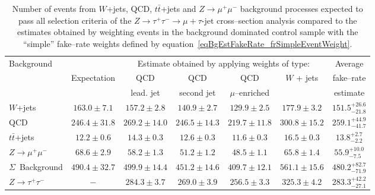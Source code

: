 \begin{table}[t]
\begin{center}
\tablesize
\begin{tabular}{|l|c|c|c|c|c|c|}
\hline
\multirow{2}{22mm}{Background}  &             & \multicolumn{4}{c|}{Estimate obtained by applying weights of type:} & Average \\
\multirow{2}{18mm}{Process}     & Expectation & QCD       & QCD        & QCD             & \multirow{2}{18mm}{$W$ + jets} & fake--rate \\
                                &             & lead. jet & second jet & $\mu$--enriched &                                & estimate \\
\hline
\hline
$W$+jets                        & $163.0 \pm  7.1$ & $157.2 \pm  2.8$ & $140.9 \pm  2.7$ & $129.9 \pm  2.5$ & $177.9 \pm  3.2$ & $151.5^{+26.6}_{-21.8}$ \\
QCD                             & $246.4 \pm 31.8$ & $269.2 \pm 14.0$ & $246.5 \pm 14.3$ & $219.7 \pm 11.8$ & $300.8 \pm 15.2$ & $259.1^{+44.9}_{-41.7}$ \\
$t\bar{t}$+jets                 & $ 12.2 \pm  0.6$ & $ 14.3 \pm  0.3$ & $ 12.6 \pm  0.3$ & $ 11.6 \pm  0.3$ & $ 16.5 \pm  0.3$ & $ 13.8^{+2.7}_{-2.2}$ \\
$Z \rightarrow \mu^{+} \mu^{-}$ & $ 68.6 \pm  2.9$ & $ 58.2 \pm  1.3$ & $ 51.2 \pm  1.2$ & $ 48.5 \pm  1.1$ & $ 65.8 \pm  1.4$ & $ 55.9^{+10.0}_{-7.5}$ \\
\hline
$\Sigma$~Background             & $490.4 \pm 32.7$ & $499.9 \pm 14.4$ & $451.2 \pm 14.6$ & $409.7 \pm 12.1$ & $561.1 \pm 15.6$ & $480.2^{+82.7}_{-71.9}$ \\     
\hline
\hline
$Z \rightarrow \tau^{+} \tau^{-}$ & $-$ & $284.3 \pm 3.7$ & $269.0 \pm 3.9$ & $256.5 \pm 3.3$ & $325.3 \pm 4.2$ & $283.3^{+42.2}_{-27.1}$ \\
\hline
\end{tabular}
\end{center}
\begin{center}
\caption{\captiontext Number of events from $W$+jets, QCD, $t\bar{t}$+jets
         and $Z \rightarrow \mu^{+} \mu^{-}$ background processes
	 expected to pass all selection criteria of the 
         $Z \rightarrow \tau^{+} \tau^{-} \rightarrow \mu + \tau\mbox{-jet}$ cross--section analysis
         compared to the estimates obtained by weighting events in the background dominated control sample 
         with the ``simple'' fake--rate weights
         defined by equation~\ref{eqBgEstFakeRate_frSimpleEventWeight}.}
\label{tabBgEstFakeRate_frSimpleResults}
\end{center}
\end{table}

